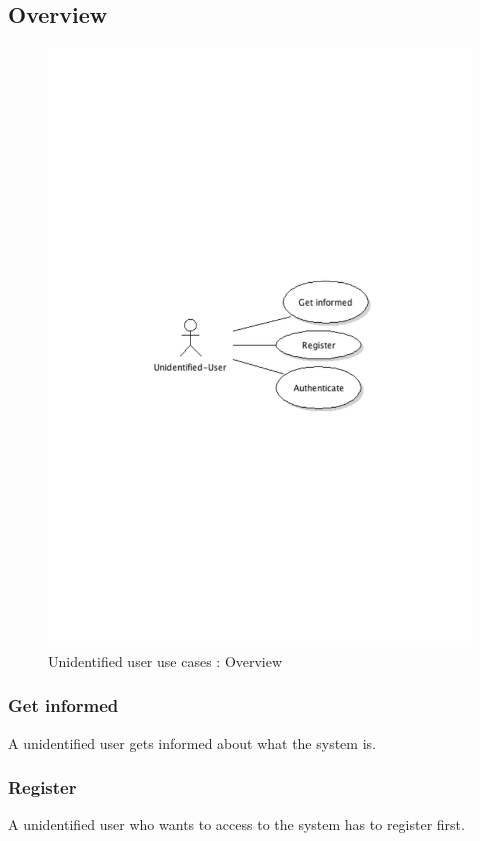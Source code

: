 	\subsection{Overview}
		\begin{figure}[ht]
			\begin{center}
				\includegraphics[width=\textwidth,  trim=2cm 12cm 2cm 11cm]{UML_figure/use_cases/uni_user/UC_UniUser_General.pdf}
				\caption{Unidentified user use cases : Overview}
			\end{center}
		\end{figure}
		\subsubsection{Get informed}A unidentified user gets informed about what the system is.
		\subsubsection{Register}A unidentified user who wants to access to the system has to register first.

